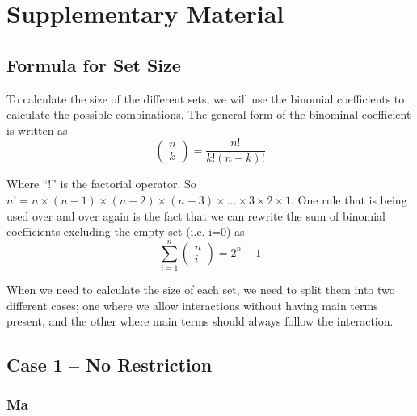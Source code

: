 \section{Supplementary Material} 

\setcounter{table}{0}
\renewcommand{\thetable}{SI\arabic{table}}

\subsection{Formula for Set Size}
To calculate the size of the different sets, we will use the binomial coefficients to calculate the possible combinations. The general form of the binominal coefficient is written as
\[\left( \begin{array}{c}
n \\ 
k \end{array}
\right)=\frac{n!}{k!\left(n-k\right)!}\] 

Where ``!'' is the factorial operator. So $n!=n\times \left(n-1\right)\times \left(n-2\right)\times \left(n-3\right)\times \dots \times 3\times 2\times 1$. One rule that is being used over and over again is the fact that we can rewrite the sum of binomial coefficients excluding the empty set (i.e. i=0) as 
\[\sum^n_{i=1}{\left( \begin{array}{c}
n \\ 
i \end{array}
\right)}=2^n-1\] 

When we need to calculate the size of each set, we need to split them into two different cases; one where we allow interactions without having main terms present, and the other where main terms should always follow the interaction. \\

\subsection{Case 1 – No Restriction}
\subsubsection{Ma} \hfill 

